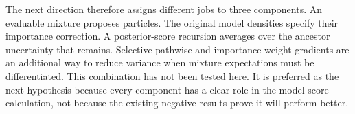 The next direction therefore assigns different jobs to three components.
An evaluable mixture proposes particles. The original model densities specify
their importance correction. A posterior-score recursion averages over the
ancestor uncertainty that remains. Selective pathwise and importance-weight
gradients are an additional way to reduce variance when mixture expectations
must be differentiated. This combination has not been tested here. It is
preferred as the next hypothesis because every component has a clear role in
the model-score calculation, not because the existing negative results prove
it will perform better.
